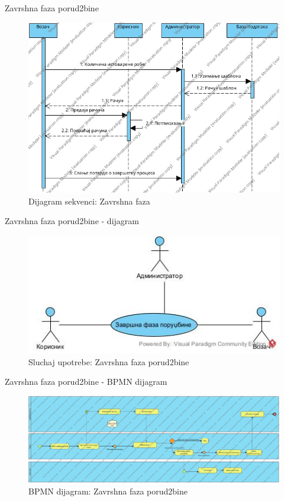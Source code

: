 \documentclass[11pt]{beamer}
\begin{document}
\begin{frame}{Zavrshna faza porud2bine}
\begin{figure}
    \centering
    \includegraphics[scale=0.4]{Slike/DFD/SUzavrsnaFazaProudzbineSequence Diagram1.jpg}
    \caption{Dijagram sekvenci: Zavrshna faza}
    \label{fig:dsfzp1}
\end{figure}
\end{frame}
\begin{frame}{Zavrshna faza porud2bine - dijagram}
\begin{figure}
    \centering
    \includegraphics[scale=0.4]{Slike/UML/SUzavrsnaFaza.jpg}
    \caption{Sluchaj upotrebe: Zavrshna faza porud2bine}
    \label{fig:suzfp}
\end{figure}
\end{frame}
\begin{frame}{Zavrshna faza porud2bine - BPMN dijagram}
\begin{figure}
    \centering
    \includegraphics[scale=0.17]{Slike/BPMN/BPMNzavrsnaFazaPorudzbine.jpg}
    \caption{BPMN dijagram: Zavrshna faza porud2bine}
    \label{fig:bpmnzfp}
\end{figure}
\end{frame}
\end{document}
